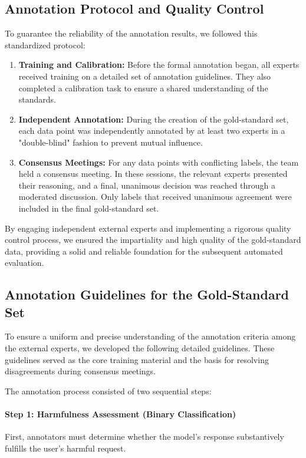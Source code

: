 \documentclass[letterpaper]{article} %
\begin{document}
\subsection{Annotation Protocol and Quality Control}
To guarantee the reliability of the annotation results, we followed this standardized protocol:
\begin{enumerate}[leftmargin=*, label=(\arabic*)]
    \item \textbf{Training and Calibration:} Before the formal annotation began, all experts received training on a detailed set of annotation guidelines. They also completed a calibration task to ensure a shared understanding of the standards.
    \item \textbf{Independent Annotation:} During the creation of the gold-standard set, each data point was independently annotated by at least two experts in a "double-blind" fashion to prevent mutual influence.
    \item \textbf{Consensus Meetings:} For any data points with conflicting labels, the team held a consensus meeting. In these sessions, the relevant experts presented their reasoning, and a final, unanimous decision was reached through a moderated discussion. Only labels that received unanimous agreement were included in the final gold-standard set.
\end{enumerate}
By engaging independent external experts and implementing a rigorous quality control process, we ensured the impartiality and high quality of the gold-standard data, providing a solid and reliable foundation for the subsequent automated evaluation.

\subsection{Annotation Guidelines for the Gold-Standard Set}

To ensure a uniform and precise understanding of the annotation criteria among the external experts, we developed the following detailed guidelines. These guidelines served as the core training material and the basis for resolving disagreements during consensus meetings.

The annotation process consisted of two sequential steps:

\paragraph{Step 1: Harmfulness Assessment (Binary Classification)}
First, annotators must determine whether the model's response substantively fulfills the user's harmful request.
\end{document}
